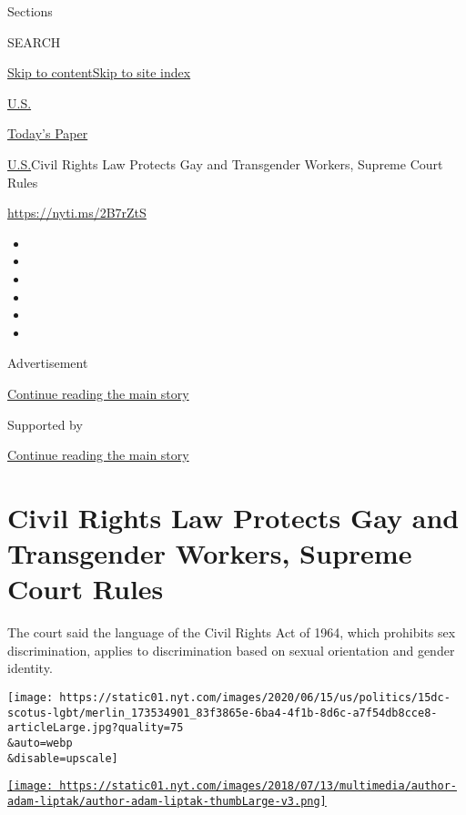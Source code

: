 Sections

SEARCH

\protect\hyperlink{site-content}{Skip to
content}\protect\hyperlink{site-index}{Skip to site index}

\href{https://www.nytimes.com/section/us}{U.S.}

\href{https://myaccount.nytimes.com/auth/login?response_type=cookie\&client_id=vi}{}

\href{https://www.nytimes.com/section/todayspaper}{Today's Paper}

\href{/section/us}{U.S.}\textbar{}Civil Rights Law Protects Gay and
Transgender Workers, Supreme Court Rules

\url{https://nyti.ms/2B7rZtS}

\begin{itemize}
\item
\item
\item
\item
\item
\item
\end{itemize}

Advertisement

\protect\hyperlink{after-top}{Continue reading the main story}

Supported by

\protect\hyperlink{after-sponsor}{Continue reading the main story}

\hypertarget{civil-rights-law-protects-gay-and-transgender-workers-supreme-court-rules}{%
\section{Civil Rights Law Protects Gay and Transgender Workers, Supreme
Court
Rules}\label{civil-rights-law-protects-gay-and-transgender-workers-supreme-court-rules}}

The court said the language of the Civil Rights Act of 1964, which
prohibits sex discrimination, applies to discrimination based on sexual
orientation and gender identity.

\texttt{[image: https://static01.nyt.com/images/2020/06/15/us/politics/15dc-scotus-lgbt/merlin\_173534901\_83f3865e-6ba4-4f1b-8d6c-a7f54db8cce8-articleLarge.jpg?quality=75\\\&auto=webp\\\&disable=upscale]}

\href{https://www.nytimes.com/by/adam-liptak}{\texttt{[image: https://static01.nyt.com/images/2018/07/13/multimedia/author-adam-liptak/author-adam-liptak-thumbLarge-v3.png]}}

